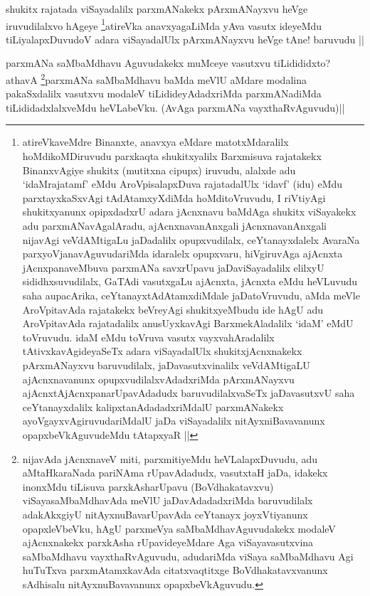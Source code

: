 \begin{artha}
shukitx rajatada viSayadalilx parxmANakekx pArxmANayxvu heVge iruvudilalxvo hAgeye \footnote{atireVkaveMdre Binanxte, anavxya eMdare matotxMdaralilx hoMdikoMDiruvudu parxkaqta shukitxyalilx Barxmisuva rajatakekx BinanxvAgiye shukitx (mutitxna cipupx) iruvudu, alalxde adu `idaMrajatamf' eMdu AroVpisalapxDuva rajatadalUlx `idavf' (idu) eMdu parxtayxkaSxvAgi tAdAtamxyXdiMda hoMditoVruvudu, I riVtiyAgi shukitxyanunx opipxdadxrU adara jAcnxnavu baMdAga shukitx viSayakekx adu parxmANavAgalAradu, ajAcnxnavanAnxgali jAcnxnavanAnxgali nijavAgi veVdAMtigaLu jaDadalilx opupxvudilalx, ceYtanayxdalelx AvaraNa parxyoVjanavAguvudariMda idaralelx opupxvaru, hiVgiruvAga ajAcnxta jAcnxpanaveMbuva parxmANa savxrUpavu jaDaviSayadalilx elilxyU sididhxsuvudilalx, GaTAdi vasutxgaLu ajAcnxta, jAcnxta eMdu heVLuvudu saha aupacArika, ceYtanayxtAdAtamxdiMdale jaDatoVruvudu, aMda meVle AroVpitavAda rajatakekx beVreyAgi shukitxyeMbudu ide hAgU adu AroVpitavAda rajatadalilx anusUyxkavAgi BarxmekAladalilx `idaM' eMdU toVruvudu. idaM eMdu toVruva vasutx vayxvahAradalilx tAtivxkavAgideyaSeTx adara viSayadalUlx shukitxjAcnxnakekx pArxmANayxvu baruvudilalx, jaDavasutxvinalilx veVdAMtigaLU ajAcnxnavanunx opupxvudilalxvAdadxriMda pArxmANayxvu ajAcnxtAjAcnxpanarUpavAdadudx baruvudilalxvaSeTx jaDavasutxvU saha ceYtanayxdalilx kalipxtanAdadadxriMdalU parxmANakekx ayoVgayxvAgiruvudariMdalU jaDa viSayadalilx nitAyxniBavavanunx opapxbeVkAguvudeMdu tAtapxyaR ||}atireVka anavxyagaLiMda yAva vasutx ideyeMdu tiLiyalapxDuvudoV adara viSayadalUlx pArxmANayxvu heVge tAne! baruvudu ||
\end{artha}

\begin{artha}
parxmANa saMbaMdhavu Aguvudakekx muMceye vasutxvu tiLidididxto? athavA \footnote{nijavAda jAcnxnaveV miti, parxmitiyeMdu heVLalapxDuvudu, adu aMtaHkaraNada pariNAma rUpavAdadudx, vasutxtaH jaDa, idakekx inonxMdu tiLisuva parxkAsharUpavu (BoVdhakatavxvu) viSayasaMbaMdhavAda meVlU jaDavAdadadxriMda baruvudilalx adakAkxgiyU nitAyxnuBavarUpavAda ceYtanayx joyxVtiyanunx opapxleVbeVku, hAgU parxmeVya saMbaMdhavAguvudakekx modaleV ajAcnxnakekx parxkAsha rUpavideyeMdare Aga viSayavasutxvina saMbaMdhavu vayxthaRvAguvudu, adudariMda viSaya saMbaMdhavu Agi huTuTxva parxmAtamxkavAda citatxvaqtitxge BoVdhakatavxvanunx sAdhisalu nitAyxnuBavavanunx opapxbeVkAguvudu.}parxmANa saMbaMdhavu baMda meVlU aMdare modalina pakaSxdalilx vasutxvu modaleV tiLidideyAdadxriMda parxmANadiMda tiLididadxlalxveMdu heVLabeVku. (AvAga parxmANa vayxthaRvAguvudu)||
\end{artha}

